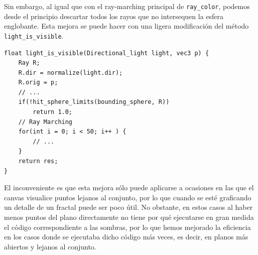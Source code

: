 Sin embargo, al igual que con el ray-marching principal de \verb|ray_color|, podemos desde el principio descartar todos los rayos que no intersequen la esfera englobante. Esta mejora se puede hacer con una ligera modificación del método \verb|light_is_visible|.

\begin{lstlisting}
float light_is_visible(Directional_light light, vec3 p) {
    Ray R;
    R.dir = normalize(light.dir);
    R.orig = p;
    // ... 
    if(!hit_sphere_limits(bounding_sphere, R))
        return 1.0;
    // Ray Marching
    for(int i = 0; i < 50; i++ ) {
        // ... 
    }
    return res;
}
\end{lstlisting}

El inconveniente es que esta mejora sólo puede aplicarse a ocasiones en las que el canvas visualice puntos lejanos al conjunto, por lo que cuando se esté graficando un detalle de un fractal puede ser poco útil. No obstante, en estos casos al haber menos puntos del plano directamente no tiene por qué ejecutarse en gran medida el código correspondiente a las sombras, por lo que hemos mejorado la eficiencia en los casos donde se ejecutaba dicho código más veces, es decir, en planos más abiertos y lejanos al conjunto.

